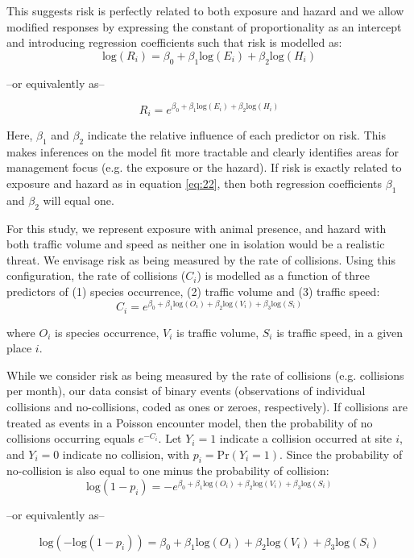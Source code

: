 This suggests risk is perfectly related to both exposure and hazard and we allow modified responses by expressing the constant of proportionality as an intercept and introducing regression coefficients such that risk is modelled as: 
\begin{equation} \label{eq:23}
\text{log}(R_i)=\beta_0+\beta_1\text{log}(E_i)+\beta_2\text{log}(H_i)
\end{equation}
\begin{center}
--or equivalently as--
\end{center}
\begin{equation} \label{eq:24}
R_i=e^{\beta_0+\beta_1\text{log}(E_i)+\beta_2\text{log}(H_i)}
\end{equation}

Here, $\beta_1$ and $\beta_2$ indicate the relative influence of each predictor on risk. This makes inferences on the model fit more tractable and clearly identifies areas for management focus (e.g. the exposure or the hazard). If risk is exactly related to exposure and hazard as in equation \ref{eq:22}, then both regression coefficients $\beta_1$ and $\beta_2$ will equal one.

For this study, we represent exposure with animal presence, and hazard with both traffic volume and speed as neither one in isolation would be a realistic threat. We envisage risk as being measured by the rate of collisions. Using this configuration, the rate of collisions ($C_i$) is modelled as a function of three predictors of (1) species occurrence, (2) traffic volume and (3) traffic speed: 
\begin{equation} \label{eq:25}
C_i=e^{\beta_0+\beta_1\text{log}(O_i)+\beta_2\text{log}(V_i)+\beta_3\text{log}(S_i)}
\end{equation}

where $O_i$ is species occurrence, $V_i$ is traffic volume, $S_i$ is traffic speed, in a given place $i$.

While we consider risk as being measured by the rate of collisions (e.g. collisions per month), our data consist of binary events (observations of individual collisions and no-collisions, coded as ones or zeroes, respectively). If collisions are treated as events in a Poisson encounter model, then the probability of no collisions occurring equals $e^{-C_i}$. Let $Y_i=1$ indicate a collision occurred at site $i$, and $Y_i=0$ indicate no collision, with $p_i=\text{Pr}(Y_i=1)$. Since the probability of no-collision is also equal to one minus the probability of collision:
\begin{equation} \label{eq:26}
\text{log}(1-p_i)=-e^{\beta_0+\beta_1\text{log}(O_i)+\beta_2\text{log}(V_i)+\beta_3\text{log}(S_i)}
\end{equation}
\begin{center}
--or equivalently as-- 
\end{center}
\begin{equation} \label{eq:27}
\text{log}(-\text{log}(1-p_i))=\beta_0+\beta_1\text{log}(O_i)+\beta_2\text{log}(V_i)+\beta_3\text{log}(S_i)
\end{equation}


